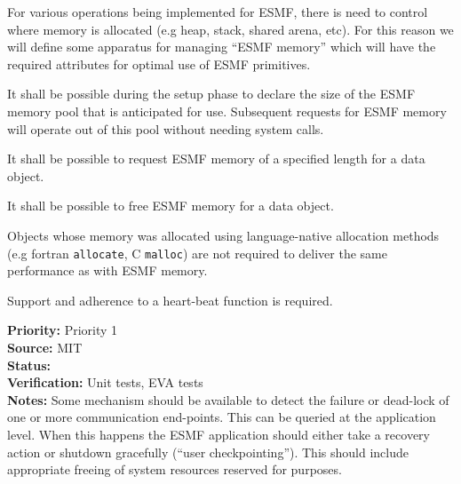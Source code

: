 
For various operations being implemented for ESMF, there is need to
control where memory is allocated (e.g heap, stack, shared arena,
etc). For this reason we will define some apparatus for managing
``ESMF memory'' which will have the required attributes for optimal
use of ESMF primitives.


It shall be possible during the setup phase to declare the size of the
ESMF memory pool that is anticipated for use. Subsequent requests for
ESMF memory will operate out of this pool without needing system
calls.


It shall be possible to request ESMF memory of a specified length for
a data object.



It shall be possible to free ESMF memory for a data object.


Objects whose memory was allocated using language-native allocation
methods (e.g fortran \texttt{allocate}, C \texttt{malloc}) are not
required to deliver the same performance as with ESMF memory.


Support and adherence to a heart-beat function is required.

\begin{reqlist}
  {\bf Priority:} Priority 1 \\
  {\bf Source:}  MIT \\
  {\bf Status:}  \\
  {\bf Verification:} Unit tests, EVA tests \\
  {\bf Notes:} Some mechanism should be available to detect the
  failure or dead-lock of one or more communication end-points. This
  can be queried at the application level. When this happens the ESMF
  application should either take a recovery action or shutdown
  gracefully (``user checkpointing''). This should include appropriate
  freeing of system resources reserved for {\bf \shortname} purposes.
\end{reqlist}
